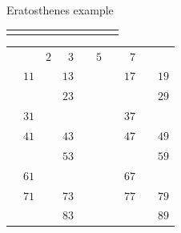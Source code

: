 \documentclass{beamer}
\begin{document}
\begin{frame}[plain]{Eratosthenes example}
{\begin{tabular}{r r r r r r r r r r}
			\phantom{$888$} & \phantom{$888$} & \phantom{$888$} & \phantom{$888$} & \phantom{$888$} & \phantom{$888$} & \phantom{$888$} & \phantom{$888$} & \phantom{$888$} & \phantom{$888$}
        \end{tabular}
	}
	 {
		\begin{tabular}{r r r r r r r r r r}
			                   &                    & \color{black}  $2$ & \color{black}  $3$ &                    & \color{black}  $5$ &                    & \color{ blue}  $7$ &                    &                   \\
			                   & \color{black} $11$ &                    & \color{black} $13$ &                    &                    &                    & \color{black} $17$ &                    & \color{black} $19$\\
			                   &                    &                    & \color{black} $23$ &                    &                    &                    &                    &                    & \color{black} $29$\\
			                   & \color{black} $31$ &                    &                    &                    &                    &                    & \color{black} $37$ &                    &                   \\
			                   & \color{black} $41$ &                    & \color{black} $43$ &                    &                    &                    & \color{black} $47$ &                    & \color{  red} $49$\\
			                   &                    &                    & \color{black} $53$ &                    &                    &                    &                    &                    & \color{black} $59$\\
			                   & \color{black} $61$ &                    &                    &                    &                    &                    & \color{black} $67$ &                    &                   \\
			                   & \color{black} $71$ &                    & \color{black} $73$ &                    &                    &                    & \color{  red} $77$ &                    & \color{black} $79$\\
			                   &                    &                    & \color{black} $83$ &                    &                    &                    &                    &                    & \color{black} $89$\\

\end{tabular}}
\end{frame}
\end{document}
